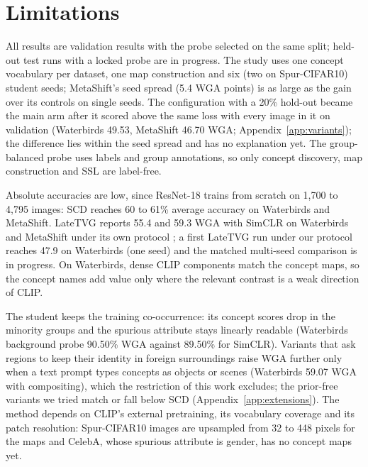 \documentclass{article}
\begin{document}
\section{Limitations}
All results are validation results with the probe selected on the same split; held-out test runs with a locked probe are in progress. The study uses one concept vocabulary per dataset, one map construction and six (two on Spur-CIFAR10) student seeds; MetaShift's seed spread (5.4 WGA points) is as large as the gain over its controls on single seeds. The configuration with a 20\% hold-out became the main arm after it scored above the same loss with every image in it on validation (Waterbirds 49.53, MetaShift 46.70 WGA; Appendix~\ref{app:variants}); the difference lies within the seed spread and has no explanation yet. The group-balanced probe uses labels and group annotations, so only concept discovery, map construction and SSL are label-free.

Absolute accuracies are low, since ResNet-18 trains from scratch on 1,700 to 4,795 images: SCD reaches 60 to 61\% average accuracy on Waterbirds and MetaShift. LateTVG reports 55.4 and 59.3 WGA with SimCLR on Waterbirds and MetaShift under its own protocol \citep{hamidieh2024latetvg}; a first LateTVG run under our protocol reaches 47.9 on Waterbirds (one seed) and the matched multi-seed comparison is in progress. On Waterbirds, dense CLIP components match the concept maps, so the concept names add value only where the relevant contrast is a weak direction of CLIP.

The student keeps the training co-occurrence: its concept scores drop in the minority groups and the spurious attribute stays linearly readable (Waterbirds background probe 90.50\% WGA against 89.50\% for SimCLR). Variants that ask regions to keep their identity in foreign surroundings raise WGA further only when a text prompt types concepts as objects or scenes (Waterbirds 59.07 WGA with compositing), which the restriction of this work excludes; the prior-free variants we tried match or fall below SCD (Appendix~\ref{app:extensions}). The method depends on CLIP's external pretraining, its vocabulary coverage and its patch resolution: Spur-CIFAR10 images are upsampled from 32 to 448 pixels for the maps and CelebA, whose spurious attribute is gender, has no concept maps yet.
\end{document}
